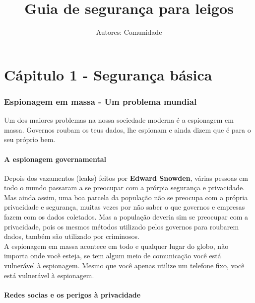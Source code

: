 \documentclass[12pt, letterpaper]{report}
\title{\Huge Guia de seguran\c{c}a para leigos} %
\author{Autores: Comunidade} %
\begin{document}
\maketitle %
\pagebreak %

\part{Cápitulo 1 - Segurança básica}

\section*{Espionagem em massa - Um problema mundial} %

\large Um dos maiores problemas na nossa sociedade moderna é a espionagem em massa. Governos roubam os teus dados, lhe espionam e ainda dizem que é para o seu próprio bem.\\

\subsection{A espionagem governamental}

	Depois dos vazamentos (leaks) feitos por \textbf{Edward Snowden}, várias pessoas em todo o mundo passaram a se preocupar com a prórpia segurança e privacidade. Mas ainda assim, uma boa parcela da população não se preocupa com a própria privacidade e segurança, muitas vezes por não saber o que governos e empresas fazem com os dados coletados. Mas a população deveria sim se  preocupar com a privacidade, pois os mesmos métodos utilizado pelos governos para roubarem dados, também são utilizado por criminosos.\\

	A espionagem em massa acontece em todo e qualquer lugar do globo, não importa onde você esteja, se tem algum meio de comunicação você está vulnerável à espionagem. Mesmo que você apenas utilize um telefone fixo, você está vulnerável à espionagem.\\

\subsection{Redes socias e os perigos à privacidade}
\end{document}
